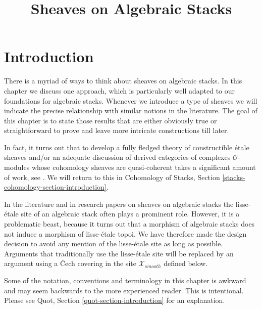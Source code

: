 

%


\title{Sheaves on Algebraic Stacks}


\maketitle

\label{section-phantom}

\tableofcontents

\section{Introduction}
\label{section-introduction}

\noindent
There is a myriad of ways to think about sheaves on algebraic stacks.
In this chapter we discuss one approach, which is particularly well
adapted to our foundations for algebraic stacks. Whenever we introduce
a type of sheaves we will indicate the precise relationship with
similar notions in the literature.
The goal of this chapter is to state those results
that are either obviously true or straightforward to prove
and leave more intricate constructions till later.

\medskip\noindent
In fact, it turns out that to develop a fully fledged theory of
constructible \'etale sheaves and/or an adequate discussion of
derived categories of complexes $\mathcal{O}$-modules whose
cohomology sheaves are quasi-coherent takes a significant amount of work, see
\cite{olsson_sheaves}. We will return to this in
Cohomology of Stacks, Section \ref{stacks-cohomology-section-introduction}.

\medskip\noindent
In the literature and in research papers on sheaves on algebraic stacks
the lisse-\'etale site of an algebraic stack often plays a prominent role.
However, it is a problematic beast, because it turns out that a morphism of
algebraic stacks does not induce a morphism of lisse-\'etale topoi. We have
therefore made the design decision to avoid any mention of the lisse-\'etale
site as long as possible. Arguments that traditionally use the lisse-\'etale
site will be replaced by an argument using a {\v C}ech covering
in the site $\mathcal{X}_{smooth}$ defined below.

\medskip\noindent
Some of the notation, conventions and terminology in this chapter is awkward
and may seem backwards to the more experienced reader. This is intentional.
Please see Quot, Section \ref{quot-section-introduction} for an
explanation.




